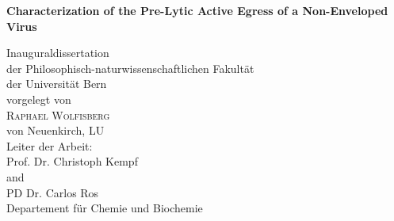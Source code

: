 \documentclass[11pt, titlepage, a4paper, twoside, onecolumn, DIV=calc]{scrbook} %
\begin{document}



\captionsetup[table]{singlelinecheck=off} %




\begin{titlepage}

\vspace{1.3cm} %

\begin{center}
\begin{spacing}{2.5}
{\Huge \bfseries Characterization of the Pre-Lytic Active Egress of a Non-Enveloped Virus} \\[1.7 cm]
\end{spacing}

\vspace{0.5cm} %

{\Large Inauguraldissertation \\
der Philosophisch-naturwissenschaftlichen Fakultät \\
der Universität Bern \\[2.2cm] %
{\large vorgelegt von}\\[0.3 cm]
{\LARGE\textsc{Raphael Wolfisberg}} \\[0.3 cm] 
{\large von Neuenkirch, LU} \\ [2.5 cm] %
{\Large Leiter der Arbeit:\\ [0.3 cm]
{\textsc Prof. Dr. Christoph Kempf} \\
and \\
{\textsc PD Dr. Carlos Ros} \\ [.6 cm] %
Departement für Chemie und Biochemie}}
\end{center}
\end{titlepage}
\cleardoublepage
\end{document}
